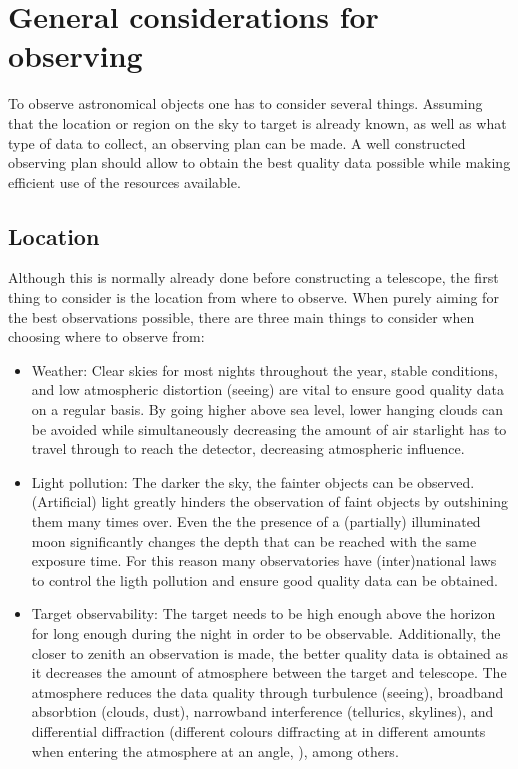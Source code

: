 \documentclass[a4paper,oneside,12pt, class=Latex/Classes/PhDthesisPSnPDF, crop=false]{standalone}
\begin{document}
\section{General considerations for observing}
\label{considerations}
To observe astronomical objects one has to consider several things. Assuming that the location or region on the sky to target is already known, as well as what type of data to collect, an observing plan can be made. A well constructed observing plan should allow to obtain the best quality data possible while making efficient use of the resources available.


\subsection{Location}
Although this is normally already done before constructing a telescope, the first thing to consider is the location from where to observe. When purely aiming for the best observations possible, there are three main things to consider when choosing where to observe from:
\begin{itemize}
	\item {Weather: Clear skies for most nights throughout the year, stable conditions, and low atmospheric distortion (seeing) are vital to ensure good quality data on a regular basis. By going higher above sea level, lower hanging clouds can be avoided while simultaneously decreasing the amount of air starlight has to travel through to reach the detector, decreasing atmospheric influence.}
	\item {Light pollution: The darker the sky, the fainter objects can be observed. (Artificial) light greatly hinders the observation of faint objects by outshining them many times over. Even the the presence of a (partially) illuminated moon significantly changes the depth that can be reached with the same exposure time. For this reason many observatories have (inter)national laws to control the ligth pollution and ensure good quality data can be obtained.}
	\item {Target observability: The target needs to be high enough above the horizon for long enough during the night in order to be observable. Additionally, the closer to zenith an observation is made, the better quality data is obtained as it decreases the amount of atmosphere between the target and telescope. The atmosphere reduces the data quality through turbulence (seeing), broadband absorbtion (clouds, dust), narrowband interference (tellurics, skylines), and differential diffraction (different colours diffracting at in different amounts when entering the atmosphere at an angle, \citealt{diff_refrac_atmosphere}), among others.}
\end{itemize}
\end{document}
